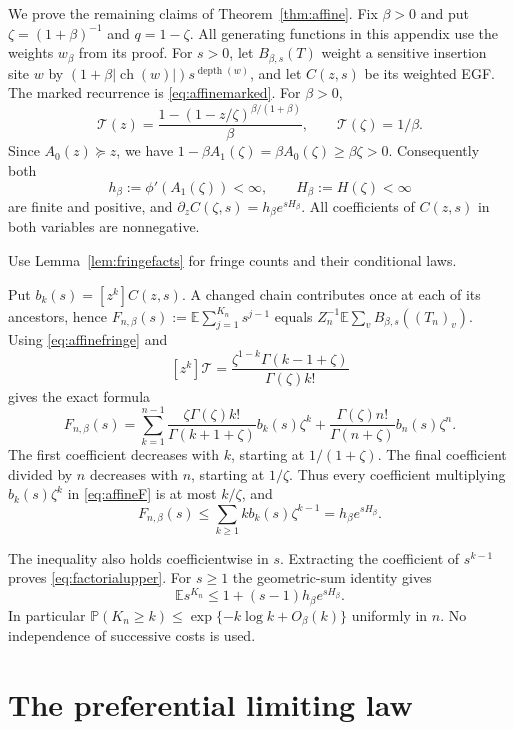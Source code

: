 \documentclass[runningheads,envcountsame,orivec]{llncs}
\newcommand{\E}{\mathbb E}
\newcommand{\PP}{\mathbb P}
\newcommand{\ch}{\operatorname{ch}}
\begin{document}
We prove the remaining claims of Theorem~\ref{thm:affine}. Fix $\beta>0$
and put $\zeta=(1+\beta)^{-1}$ and $q=1-\zeta$. All generating
functions in this appendix use the weights $w_\beta$ from its proof.
For $s>0$, let $B_{\beta,s}(T)$ weight a sensitive insertion site $w$
by $(1+\beta|\ch(w)|)s^{\operatorname{depth}(w)}$, and let $C(z,s)$
be its weighted EGF. The marked recurrence is \eqref{eq:affinemarked}.
For $\beta>0$,
\[
 \mathcal T(z)=\frac{1-(1-z/\zeta)^{\beta/(1+\beta)}}\beta,
 \qquad \mathcal T(\zeta)=1/\beta.
\]
Since $A_0(z)\succeq z$, we have
$1-\beta A_1(\zeta)=\beta A_0(\zeta)\ge\beta\zeta>0$.
Consequently both
\[
 h_\beta:=\phi'(A_1(\zeta))<\infty,
 \qquad H_\beta:=H(\zeta)<\infty
\]
are finite and positive, and
$\partial_z C(\zeta,s)=h_\beta e^{sH_\beta}$.
All coefficients of $C(z,s)$ in both variables are nonnegative.

Use Lemma~\ref{lem:fringefacts} for fringe counts and their conditional laws.

Put $b_k(s)=[z^k]C(z,s)$. A changed chain contributes once at each
of its ancestors, hence
$F_{n,\beta}(s):=\E\sum_{j=1}^{K_n}s^{j-1}$ equals
$Z_n^{-1}\E\sum_v B_{\beta,s}((T_n)_v)$.
Using \eqref{eq:affinefringe} and
\[
 [z^k]\mathcal T
 =\frac{\zeta^{1-k}\Gamma(k-1+\zeta)}{\Gamma(\zeta)k!}
\]
gives the exact formula
\begin{equation}\label{eq:affineF}
 F_{n,\beta}(s)=
 \sum_{k=1}^{n-1}
 \frac{\zeta\Gamma(\zeta)k!}{\Gamma(k+1+\zeta)}
       b_k(s)\zeta^k
 +\frac{\Gamma(\zeta)n!}{\Gamma(n+\zeta)}b_n(s)\zeta^n.
\end{equation}
The first coefficient decreases with $k$, starting at
$1/(1+\zeta)$. The final coefficient divided by $n$ decreases with
$n$, starting at $1/\zeta$. Thus every coefficient multiplying
$b_k(s)\zeta^k$ in \eqref{eq:affineF} is at most $k/\zeta$, and
\[
 F_{n,\beta}(s)\le\sum_{k\ge1} k b_k(s)\zeta^{k-1}
 =h_\beta e^{sH_\beta}.
\]


The inequality also holds coefficientwise in $s$. Extracting the
coefficient of $s^{k-1}$ proves \eqref{eq:factorialupper}.
For $s\ge1$ the geometric-sum identity gives
\begin{equation}\label{eq:affinepgfbound}
 \E s^{K_n}\le1+(s-1)h_\beta e^{sH_\beta}.
\end{equation}
In particular $\PP(K_n\ge k)\le\exp\{-k\log k+O_\beta(k)\}$
uniformly in $n$. No independence of successive costs is used.
\section{The preferential limiting law}\label{app:affinelimit}
\end{document}
